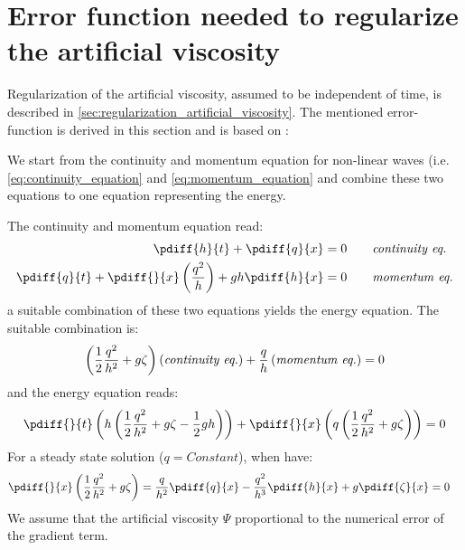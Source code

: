 \chapter{Error function needed to regularize the artificial viscosity} \label{sec:error_artificial_viscosity}
Regularization of the artificial viscosity, assumed to be independent of time, is described in \autoref{sec:regularization_artificial_viscosity}.
The mentioned error-function is derived in this section and is based on \citet[eq.\ 42]{Borsboom2001}:

We start from the continuity and momentum equation for non-linear waves (i.e. \autoref{eq:continuity_equation} and \eqref{eq:momentum_equation} and combine these two equations to one equation representing the energy. 

The continuity and momentum equation read:
\begin{align}
    \pdiff{h}{t}  + \pdiff{q}{x} & = 0 \qquad \textit{continuity eq.} 
    \\
    \pdiff{q}{t}  + \pdiff{}{x} \left( \frac{q^2}{h} \right) + g h \pdiff{h}{x} & = 0 \qquad \textit{momentum eq.}
\end{align}
a suitable combination of these two equations yields the energy equation.
The suitable combination is:
\begin{align}
    \left( \frac{1}{2} \frac{q^2}{h^2} + g \zeta\right)\left(\textit{continuity eq.}\right)  
    +
    \frac{q}{h} \left( \textit{momentum eq.} \right)= 0
\end{align}
and the energy equation reads:
\begin{align}
    \pdiff{}{t}\left( h \left(\half \frac{q^2}{h^2} + g \zeta - \half g h \right) \right) +
    \pdiff{}{x}\left( q \left( \half \frac{q^2}{h^2} + g\zeta  \right) \right)= 0
\end{align}
For a steady state solution ($q=\textit{Constant}$), when have:
\begin{align}
    &\pdiff{}{x}\left( \frac{1}{2} \frac{q^2}{h^2} + g\zeta  \right) = 
\frac{q}{h^2} \pdiff{q}{x} - \frac{q^2}{h^3}  \pdiff{h}{x} + g\pdiff{\zeta}{x} = 0
\end{align}
We assume that the artificial viscosity $\Psi$ proportional to the numerical error of the gradient term.

\notyet
